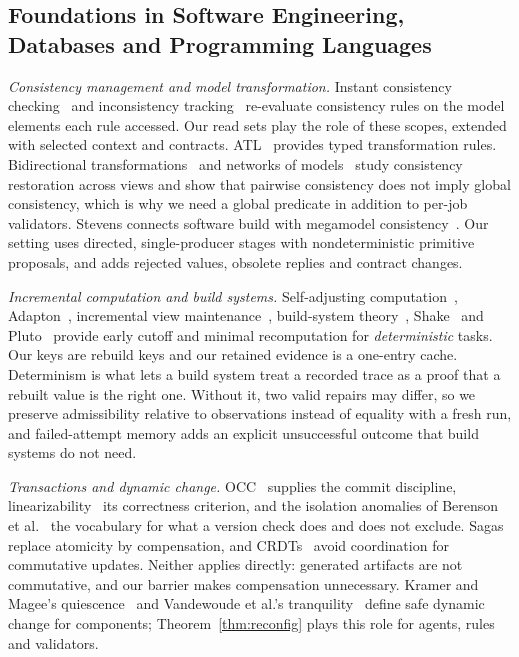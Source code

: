 \subsection{Foundations in Software Engineering, Databases and Programming Languages}
\emph{Consistency management and model transformation.} Instant consistency checking~\cite{egyed2006instant} and inconsistency tracking~\cite{egyed2011tracking} re-evaluate consistency rules on the model elements each rule accessed. Our read sets play the role of these scopes, extended with selected context and contracts. ATL~\cite{atl} provides typed transformation rules. Bidirectional transformations~\cite{foster2007lenses} and networks of models~\cite{stevens,klare} study consistency restoration across views and show that pairwise consistency does not imply global consistency, which is why we need a global predicate in addition to per-job validators. Stevens connects software build with megamodel consistency~\cite{megamodelbuild}. Our setting uses directed, single-producer stages with nondeterministic primitive proposals, and adds rejected values, obsolete replies and contract changes.

\emph{Incremental computation and build systems.} Self-adjusting computation~\cite{acar}, Adapton~\cite{hammer2014adapton}, incremental view maintenance~\cite{gupta1993dred}, build-system theory~\cite{mokhov}, Shake~\cite{mitchell2012shake} and Pluto~\cite{erdweg2015pluto} provide early cutoff and minimal recomputation for \emph{deterministic} tasks. Our keys are rebuild keys and our retained evidence is a one-entry cache. Determinism is what lets a build system treat a recorded trace as a proof that a rebuilt value is the right one. Without it, two valid repairs may differ, so we preserve admissibility relative to observations instead of equality with a fresh run, and failed-attempt memory adds an explicit unsuccessful outcome that build systems do not need.

\emph{Transactions and dynamic change.} OCC~\cite{occ} supplies the commit discipline, linearizability~\cite{herlihy1990linearizability} its correctness criterion, and the isolation anomalies of Berenson et al.~\cite{berenson1995critique} the vocabulary for what a version check does and does not exclude. Sagas~\cite{garcia1987sagas} replace atomicity by compensation, and CRDTs~\cite{shapiro2011crdt} avoid coordination for commutative updates. Neither applies directly: generated artifacts are not commutative, and our barrier makes compensation unnecessary. Kramer and Magee's quiescence~\cite{kramer1990evolving} and Vandewoude et al.'s tranquility~\cite{vandewoude2007tranquility} define safe dynamic change for components; Theorem~\ref{thm:reconfig} plays this role for agents, rules and validators.

